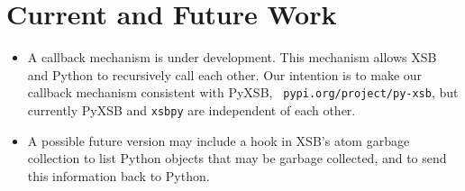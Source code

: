\section{Current and Future Work}

\begin{itemize}
\item A callback mechanism is under development.  This mechanism
  allows XSB and Python to recursively call each other.  Our intention
  is to make our callback mechanism consistent with PyXSB, {\tt
    pypi.org/project/py-xsb}, but currently PyXSB and {\tt xsbpy} are
  independent of each other.

\item A possible future version may include a hook in XSB's atom
  garbage collection to list Python objects that may be garbage
  collected, and to send this information back to Python.  
\end{itemize}  

